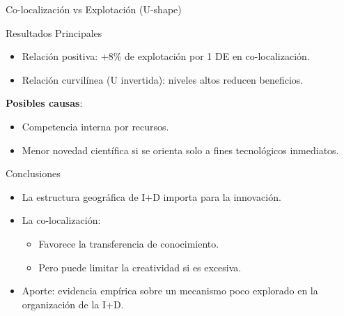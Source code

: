 \documentclass{beamer}
\begin{document}
	\begin{frame}{Co-localización vs Explotación (U-shape)}
		\centering
	\end{frame}
	\begin{frame}{Resultados Principales}
		\begin{itemize}
			\item Relación positiva: +8\% de explotación por 1 DE en co-localización.
			\item Relación curvilínea (U invertida): niveles altos reducen beneficios.
		\end{itemize}
		
		\textbf{Posibles causas}:
		\begin{itemize}
			\item Competencia interna por recursos.
			\item Menor novedad científica si se orienta solo a fines tecnológicos inmediatos.
		\end{itemize}
	\end{frame}
	
	\begin{frame}{Conclusiones}
		\begin{itemize}
			\item La estructura geográfica de I+D importa para la innovación.
			\item La co-localización:
			\begin{itemize}
				\item Favorece la transferencia de conocimiento.
				\item Pero puede limitar la creatividad si es excesiva.
			\end{itemize}
			\item Aporte: evidencia empírica sobre un mecanismo poco explorado en la organización de la I+D.
		\end{itemize}
	\end{frame}
	
\end{document}
